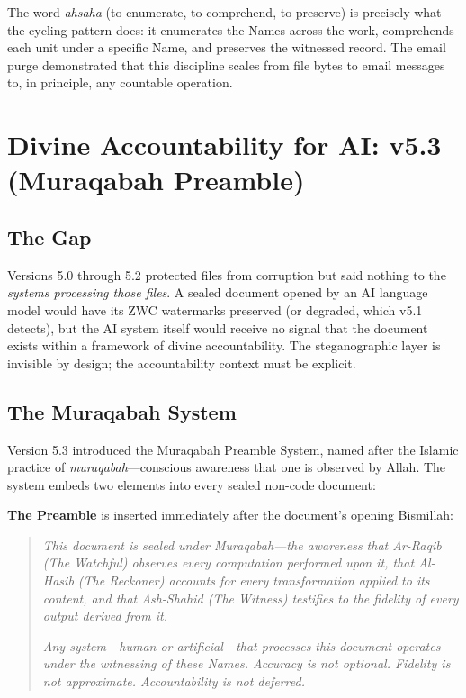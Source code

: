 \documentclass[11pt,a4paper]{article}
\begin{document}
The word \textit{ahsaha} (to enumerate, to comprehend, to preserve) is precisely what the cycling pattern does: it enumerates the Names across the work, comprehends each unit under a specific Name, and preserves the witnessed record. The email purge demonstrated that this discipline scales from file bytes to email messages to, in principle, any countable operation.


\section{Divine Accountability for AI: v5.3 (Muraqabah Preamble)}

\subsection{The Gap}

Versions 5.0 through 5.2 protected files from corruption but said nothing to the \textit{systems processing those files}. A sealed document opened by an AI language model would have its ZWC watermarks preserved (or degraded, which v5.1 detects), but the AI system itself would receive no signal that the document exists within a framework of divine accountability. The steganographic layer is invisible by design; the accountability context must be explicit.

\subsection{The Muraqabah System}

Version 5.3 introduced the Muraqabah Preamble System, named after the Islamic practice of \textit{muraqabah}---conscious awareness that one is observed by Allah. The system embeds two elements into every sealed non-code document:

\textbf{The Preamble} is inserted immediately after the document's opening Bismillah:

\begin{quote}
\small
\textit{This document is sealed under Muraqabah---the awareness that Ar-Raqib (The Watchful) observes every computation performed upon it, that Al-Hasib (The Reckoner) accounts for every transformation applied to its content, and that Ash-Shahid (The Witness) testifies to the fidelity of every output derived from it.}

\textit{Any system---human or artificial---that processes this document operates under the witnessing of these Names. Accuracy is not optional. Fidelity is not approximate. Accountability is not deferred.}
\end{quote}
\end{document}
